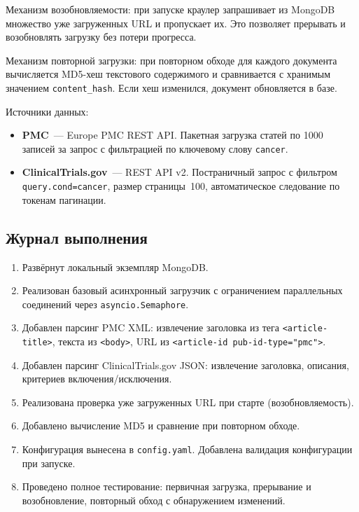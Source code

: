 \documentclass[a4paper,12pt]{article}
\begin{document}
Механизм возобновляемости: при запуске краулер запрашивает из MongoDB множество уже загруженных URL и пропускает их. Это позволяет прерывать и возобновлять загрузку без потери прогресса.

Механизм повторной загрузки: при повторном обходе для каждого документа вычисляется MD5-хеш текстового содержимого и сравнивается с хранимым значением \texttt{content\_hash}. Если хеш изменился, документ обновляется в базе.

Источники данных:
\begin{itemize}
    \item \textbf{PMC}~--- Europe PMC REST API. Пакетная загрузка статей по 1000 записей за запрос с фильтрацией по ключевому слову \texttt{cancer}.
    \item \textbf{ClinicalTrials.gov}~--- REST API v2. Постраничный запрос с фильтром \texttt{query.cond=cancer}, размер страницы~100, автоматическое следование по токенам пагинации.
\end{itemize}

\subsection{Журнал выполнения}

\begin{enumerate}
    \item Развёрнут локальный экземпляр MongoDB.
    \item Реализован базовый асинхронный загрузчик с ограничением параллельных соединений через \texttt{asyncio.Semaphore}.
    \item Добавлен парсинг PMC XML: извлечение заголовка из тега \texttt{<article-title>}, текста из \texttt{<body>}, URL из \texttt{<article-id pub-id-type="pmc">}.
    \item Добавлен парсинг ClinicalTrials.gov JSON: извлечение заголовка, описания, критериев включения/исключения.
    \item Реализована проверка уже загруженных URL при старте (возобновляемость).
    \item Добавлено вычисление MD5 и сравнение при повторном обходе.
    \item Конфигурация вынесена в \texttt{config.yaml}. Добавлена валидация конфигурации при запуске.
    \item Проведено полное тестирование: первичная загрузка, прерывание и возобновление, повторный обход с обнаружением изменений.
\end{enumerate}
\end{document}
